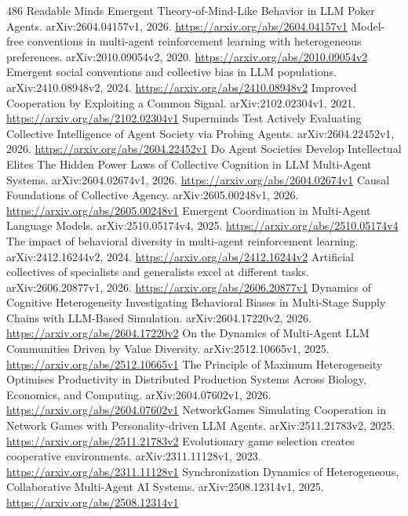 \documentclass[11pt]{article}
\begin{document}
\begin{thebibliography}{486}
 Readable Minds Emergent Theory-of-Mind-Like Behavior in LLM Poker Agents. arXiv:2604.04157v1, 2026. \url{https://arxiv.org/abs/2604.04157v1}
 Model-free conventions in multi-agent reinforcement learning with heterogeneous preferences. arXiv:2010.09054v2, 2020. \url{https://arxiv.org/abs/2010.09054v2}
 Emergent social conventions and collective bias in LLM populations. arXiv:2410.08948v2, 2024. \url{https://arxiv.org/abs/2410.08948v2}
 Improved Cooperation by Exploiting a Common Signal. arXiv:2102.02304v1, 2021. \url{https://arxiv.org/abs/2102.02304v1}
 Superminds Test Actively Evaluating Collective Intelligence of Agent Society via Probing Agents. arXiv:2604.22452v1, 2026. \url{https://arxiv.org/abs/2604.22452v1}
 Do Agent Societies Develop Intellectual Elites The Hidden Power Laws of Collective Cognition in LLM Multi-Agent Systems. arXiv:2604.02674v1, 2026. \url{https://arxiv.org/abs/2604.02674v1}
 Causal Foundations of Collective Agency. arXiv:2605.00248v1, 2026. \url{https://arxiv.org/abs/2605.00248v1}
 Emergent Coordination in Multi-Agent Language Models. arXiv:2510.05174v4, 2025. \url{https://arxiv.org/abs/2510.05174v4}
 The impact of behavioral diversity in multi-agent reinforcement learning. arXiv:2412.16244v2, 2024. \url{https://arxiv.org/abs/2412.16244v2}
 Artificial collectives of specialists and generalists excel at different tasks. arXiv:2606.20877v1, 2026. \url{https://arxiv.org/abs/2606.20877v1}
 Dynamics of Cognitive Heterogeneity Investigating Behavioral Biases in Multi-Stage Supply Chains with LLM-Based Simulation. arXiv:2604.17220v2, 2026. \url{https://arxiv.org/abs/2604.17220v2}
 On the Dynamics of Multi-Agent LLM Communities Driven by Value Diversity. arXiv:2512.10665v1, 2025. \url{https://arxiv.org/abs/2512.10665v1}
 The Principle of Maximum Heterogeneity Optimises Productivity in Distributed Production Systems Across Biology, Economics, and Computing. arXiv:2604.07602v1, 2026. \url{https://arxiv.org/abs/2604.07602v1}
 NetworkGames Simulating Cooperation in Network Games with Personality-driven LLM Agents. arXiv:2511.21783v2, 2025. \url{https://arxiv.org/abs/2511.21783v2}
 Evolutionary game selection creates cooperative environments. arXiv:2311.11128v1, 2023. \url{https://arxiv.org/abs/2311.11128v1}
 Synchronization Dynamics of Heterogeneous, Collaborative Multi-Agent AI Systems. arXiv:2508.12314v1, 2025. \url{https://arxiv.org/abs/2508.12314v1}

\end{thebibliography}
\end{document}
